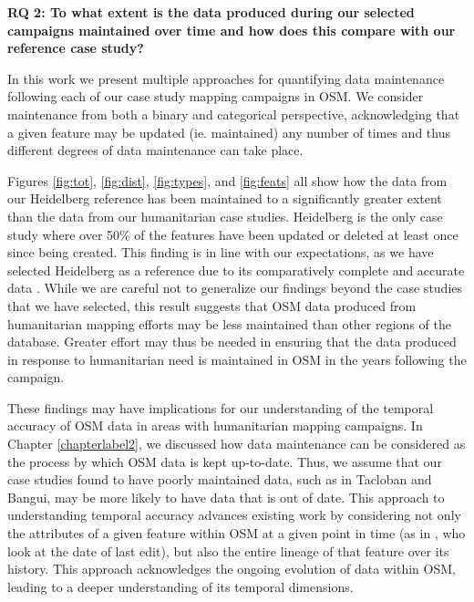 \noindent\textbf{RQ 2: To what extent is the data produced during our selected campaigns maintained over time and how does this compare with our reference case study?}

In this work we present multiple approaches for quantifying data maintenance following each of our case study mapping campaigns in OSM. We consider maintenance from both a binary and categorical perspective, acknowledging that a given feature may be updated (ie. maintained) any number of times and thus different degrees of data maintenance can take place. 

Figures \ref{fig:tot}, \ref{fig:dist}, \ref{fig:types}, and \ref{fig:feats} all show how the data from our Heidelberg reference has been maintained to a significantly greater extent than the data from our humanitarian case studies. Heidelberg is the only case study where over 50\% of the features have been updated or deleted at least once since being created. This finding is in line with our expectations, as we have selected Heidelberg as a reference due to its comparatively complete and accurate data \parencite{arsanjani_assessing_2013}. While we are careful not to generalize our findings beyond the case studies that we have selected, this result suggests that OSM data produced from humanitarian mapping efforts may be less maintained than other regions of the database. Greater effort may thus be needed in ensuring that the data produced in response to humanitarian need is maintained in OSM in the years following the campaign. 

These findings may have implications for our understanding of the temporal accuracy of OSM data in areas with humanitarian mapping campaigns. In Chapter \ref{chapterlabel2}, we discussed how data maintenance can be considered as the process by which OSM data is kept up-to-date. Thus, we assume that our case studies found to have poorly maintained data, such as in Tacloban and Bangui, may be more likely to have data that is out of date. This approach to understanding temporal accuracy advances existing work by considering not only the attributes of a given feature within OSM at a given point in time (as in \textcite{barron_comprehensive_2014}, who look at the date of last edit), but also the entire lineage of that feature over its history. This approach acknowledges the ongoing evolution of data within OSM, leading to a deeper understanding of its temporal dimensions. 

